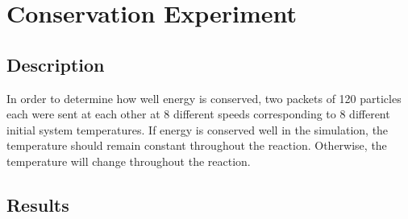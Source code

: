 \documentclass{article}
\begin{document}
\section{Conservation Experiment}
\subsection{Description}
In order to determine how well energy is conserved, two packets of 120 particles each were sent at each other at 8
different speeds corresponding to 8 different initial system temperatures. If energy is conserved well in the 
simulation, the temperature should remain constant throughout the reaction. Otherwise, the temperature will
change throughout the reaction.

\subsection{Results}
\end{document}
